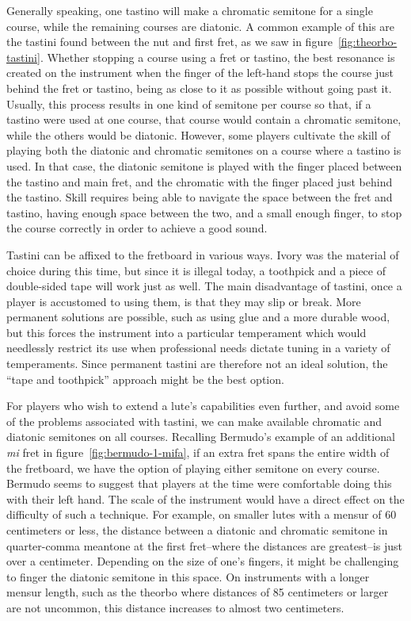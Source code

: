 Generally speaking, one tastino will make a chromatic semitone for a single course, while the
remaining courses are diatonic.  A common example of this are the tastini found between the nut and
first fret, as we saw in figure~\ref{fig:theorbo-tastini}. Whether stopping a course using a fret or
tastino, the best resonance is created on the instrument when the finger of the left-hand stops the
course just behind the fret or tastino, being as close to it as possible without going past it.
Usually, this process results in one kind of semitone per course so that, if a tastino were used at
one course, that course would contain a chromatic semitone, while the others would be diatonic.
However, some players cultivate the skill of playing both the diatonic and chromatic semitones on a
course where a tastino is used. In that case, the diatonic semitone is played with the finger placed
between the tastino and main fret, and the chromatic with the finger placed just behind the
tastino.  Skill requires being able to navigate the space between the fret and tastino, having
enough space between the two, and a small enough finger, to stop the course correctly in order
to achieve a good sound.

Tastini can be affixed to the fretboard in various ways. Ivory was the material of choice during
this time, but since it is illegal today, a toothpick and a piece of double-sided tape will work
just as well.  The main disadvantage of tastini, once a player is accustomed to using them, is
that they may slip or break.  More permanent solutions are possible, such as using glue and a more
durable wood, but this forces the instrument into a particular temperament which would needlessly
restrict its use when professional needs dictate tuning in a variety of temperaments. Since
permanent tastini are therefore not an ideal solution, the ``tape and toothpick'' approach might be
the best option.

For players who wish to extend a lute's capabilities even further, and avoid
some of the problems associated with tastini, we can make available chromatic and diatonic
semitones on all courses. Recalling Bermudo's example of an additional
\textit{mi} fret in figure~\ref{fig:bermudo-1-mifa}, if an extra fret spans the entire
width of the fretboard, we have the option of playing either semitone on every course.
Bermudo seems to suggest that players at the time were comfortable doing this with their left
hand.  The scale of the instrument would have a direct effect on the difficulty of
such a technique.  For example, on smaller lutes with a mensur of 60 centimeters or
less, the distance between a diatonic and chromatic semitone in quarter-comma meantone
at the first fret--where the distances are greatest--is just over a centimeter.
Depending on the size of one's fingers, it might be challenging to finger the diatonic
semitone in this space.  On instruments with a longer mensur length, such as the
theorbo where distances of 85 centimeters or larger are not uncommon, this distance
increases to almost two centimeters.

